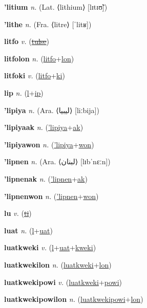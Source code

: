 \textbf{\hypertarget{'litium}{'litium}} \textit{n.} (Lat. ⟨lithium⟩ [lɪtɪʊ̃])


\textbf{\hypertarget{'lithe}{'lithe}} \textit{n.} (Fra. ⟨litre⟩ [ˈlitʁ])


\textbf{\hypertarget{litfo}{litfo}} \textit{v.} (\hyperlink{tulse}{\sout{tulse}})


\textbf{\hypertarget{litfolon}{litfolon}} \textit{n.} (\hyperlink{litfo}{litfo}+\allowbreak \hyperlink{lon}{lon})


\textbf{\hypertarget{litfoki}{litfoki}} \textit{v.} (\hyperlink{litfo}{litfo}+\allowbreak \hyperlink{ki}{ki})


\textbf{\hypertarget{lip}{lip}} \textit{n.} (\hyperlink{l}{l}+\allowbreak \hyperlink{ip}{ip})


\textbf{\hypertarget{'lipiya}{'lipiya}} \textit{n.} (Ara. ⟨{\arabics{}ليبيا‎}⟩ [liːbija])


\textbf{\hypertarget{'lipiyaak}{'lipiyaak}} \textit{n.} (\hyperlink{'lipiya}{'lipiya}+\allowbreak \hyperlink{ak}{ak})


\textbf{\hypertarget{'lipiyawon}{'lipiyawon}} \textit{n.} (\hyperlink{'lipiya}{'lipiya}+\allowbreak \hyperlink{won}{won})


\textbf{\hypertarget{'lipnen}{'lipnen}} \textit{n.} (Ara. ⟨{\arabics{}لبنان‎}⟩ [lɪbˈnɛːn])


\textbf{\hypertarget{'lipnenak}{'lipnenak}} \textit{n.} (\hyperlink{'lipnen}{'lipnen}+\allowbreak \hyperlink{ak}{ak})


\textbf{\hypertarget{'lipnenwon}{'lipnenwon}} \textit{n.} (\hyperlink{'lipnen}{'lipnen}+\allowbreak \hyperlink{won}{won})


\textbf{\hypertarget{lu}{lu}} \textit{v.} (\hyperlink{ti}{\sout{ti}})


\textbf{\hypertarget{luat}{luat}} \textit{n.} (\hyperlink{l}{l}+\allowbreak \hyperlink{uat}{uat})


\textbf{\hypertarget{luatkweki}{luatkweki}} \textit{v.} (\hyperlink{l}{l}+\allowbreak \hyperlink{uat}{uat}+\allowbreak \hyperlink{kweki}{kweki})


\textbf{\hypertarget{luatkwekilon}{luatkwekilon}} \textit{n.} (\hyperlink{luatkweki}{luatkweki}+\allowbreak \hyperlink{lon}{lon})


\textbf{\hypertarget{luatkwekipowi}{luatkwekipowi}} \textit{v.} (\hyperlink{luatkweki}{luatkweki}+\allowbreak \hyperlink{powi}{powi})


\textbf{\hypertarget{luatkwekipowilon}{luatkwekipowilon}} \textit{n.} (\hyperlink{luatkwekipowi}{luatkwekipowi}+\allowbreak \hyperlink{lon}{lon})



